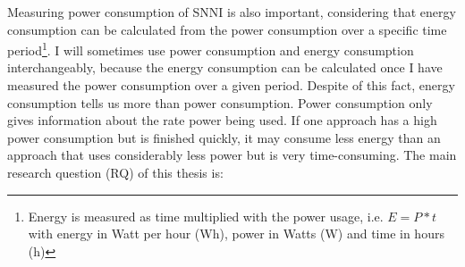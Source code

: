 \documentclass[../thesis.tex]{subfiles}
\begin{document}


Measuring power consumption of SNNI is also important, considering that energy consumption can be calculated from the power consumption over a specific time period\footnote{Energy is measured as time multiplied with the power usage, i.e. $E=P*t$ with energy in Watt per hour (Wh), power in Watts (W) and time in hours (h)}. I will sometimes use power consumption and energy consumption interchangeably, because the energy consumption can be calculated once I have measured the power consumption over a given period. Despite of this fact, energy consumption tells us more than power consumption. Power consumption only gives information about the rate power being used. If one approach has a high power consumption but is finished quickly, it may consume less energy than an approach that uses considerably less power but is very time-consuming. The main research question (RQ) of this thesis is:
\end{document}

